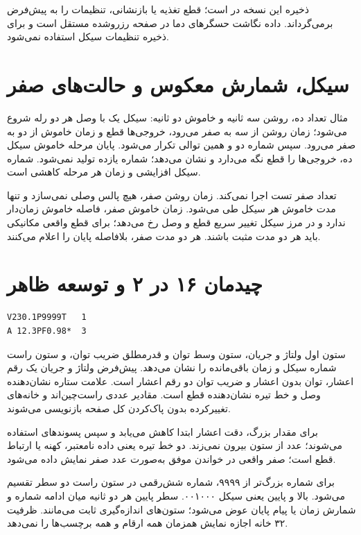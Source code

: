 ذخیره این نسخه در  است؛ قطع تغذیه یا بازنشانی، تنظیمات را به پیش‌فرض برمی‌گرداند. داده نگاشت حسگرهای دما در صفحه رزروشده  مستقل است و برای ذخیره تنظیمات سیکل استفاده نمی‌شود.

\section{سیکل، شمارش معکوس و حالت‌های صفر}
مثال تعداد ده، روشن سه ثانیه و خاموش دو ثانیه: سیکل یک با وصل هر دو رله شروع می‌شود؛ زمان روشن از سه به صفر می‌رود، خروجی‌ها قطع و زمان خاموش از دو به صفر می‌رود. سپس شماره دو و همین توالی تکرار می‌شود. پایان مرحله خاموش سیکل ده، خروجی‌ها را قطع نگه می‌دارد و  نشان می‌دهد؛ شماره یازده تولید نمی‌شود. شماره سیکل افزایشی و زمان هر مرحله کاهشی است.

تعداد صفر تست اجرا نمی‌کند. زمان روشن صفر، هیچ پالس وصلی نمی‌سازد و تنها مدت خاموش هر سیکل طی می‌شود. زمان خاموش صفر، فاصله خاموش زمان‌دار ندارد و در مرز سیکل تغییر سریع قطع و وصل رخ می‌دهد؛ برای قطع واقعی مکانیکی باید هر دو مدت مثبت باشند. هر دو مدت صفر، بلافاصله پایان را اعلام می‌کنند.

\section{چیدمان ۱۶ در ۲ و توسعه ظاهر}
\begin{latin}
\begin{lstlisting}
V230.1P9999T   1
A 12.3PF0.98*  3
\end{lstlisting}
\end{latin}

ستون اول ولتاژ و جریان، ستون وسط توان و قدرمطلق ضریب توان، و ستون راست شماره سیکل و زمان باقی‌مانده را نشان می‌دهد. پیش‌فرض ولتاژ و جریان یک رقم اعشار، توان بدون اعشار و ضریب توان دو رقم اعشار است. علامت ستاره نشان‌دهنده وصل و خط تیره نشان‌دهنده قطع است. مقادیر عددی راست‌چین‌اند و خانه‌های تغییرکرده بدون پاک‌کردن کل صفحه بازنویسی می‌شوند.

برای مقدار بزرگ، دقت اعشار ابتدا کاهش می‌یابد و سپس پسوندهای  استفاده می‌شوند؛ عدد از ستون بیرون نمی‌زند. دو خط تیره یعنی داده نامعتبر، کهنه یا ارتباط قطع است؛ صفر واقعی در خواندن موفق به‌صورت عدد صفر نمایش داده می‌شود.

برای شماره بزرگ‌تر از ۹۹۹۹، شماره شش‌رقمی در ستون راست دو سطر تقسیم می‌شود.  بالا و  پایین یعنی سیکل ۰۰۱۰۰۰. سطر پایین هر دو ثانیه میان ادامه شماره و شمارش زمان یا پیام پایان عوض می‌شود؛ ستون‌های اندازه‌گیری ثابت می‌مانند. ظرفیت ۳۲ خانه اجازه نمایش همزمان همه ارقام و همه برچسب‌ها را نمی‌دهد.

